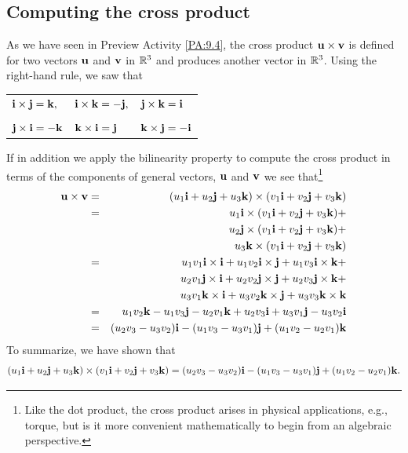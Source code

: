 

\subsection*{Computing the cross product}

As we have seen in Preview Activity \ref{PA:9.4}, the cross product
$\mathbf{u}\times\mathbf{v}$ is defined for two vectors $\mathbf{u}$ and $\mathbf{v}$ in $\mathbb{R}^3$
and produces another vector in $\mathbb{R}^3$.
Using the right-hand rule, we saw that

\begin{table}[ht]
  \label{T:9.4.cross.basis}
  \begin{center}
    \begin{tabular}{lll}
      $\mathbf{i}\times\mathbf{j} = \mathbf{k},$ \hspace*{1in} &
      $\mathbf{i}\times\mathbf{k} = -\mathbf{j},$ \hspace*{1in} &
      $\mathbf{j}\times\mathbf{k} = \mathbf{i}$\hspace*{1in} \\ \\
      $\mathbf{j}\times\mathbf{i} = -\mathbf{k}$ &
      $\mathbf{k}\times\mathbf{i} = \mathbf{j}$ &
      $\mathbf{k}\times\mathbf{j} = -\mathbf{i}$
    \end{tabular}
  \end{center}
\end{table}

If in addition we apply the bilinearity property to compute the cross product
in terms of the components of general vectors, $\mathbf{u}$ and $\mathbf{v}$ we see that\footnote{Like the dot product, the cross product arises in physical applications, e.g., torque, but is it more convenient mathematically to begin from an algebraic perspective.} 
\begin{eqnarray*}
  \mathbf{u}\times\mathbf{v} & = & (u_1\mathbf{i} + u_2\mathbf{j} + u_3\mathbf{k}) \times 
  (v_1\mathbf{i} + v_2\mathbf{j} + v_3\mathbf{k}) \\
  & = & u_1\mathbf{i}\times  (v_1\mathbf{i} + v_2\mathbf{j} + v_3\mathbf{k})+ \\
  & & u_2\mathbf{j}\times  (v_1\mathbf{i} + v_2\mathbf{j} + v_3\mathbf{k})+ \\
  & & u_3\mathbf{k}\times  (v_1\mathbf{i} + v_2\mathbf{j} + v_3\mathbf{k}) \\
  & = & u_1v_1\mathbf{i}\times\mathbf{i} + u_1v_2\mathbf{i}\times\mathbf{j} + u_1v_3\mathbf{i}\times\mathbf{k} +\\
  &  & u_2v_1\mathbf{j}\times\mathbf{i} + u_2v_2\mathbf{j}\times\mathbf{j} + u_2v_3\mathbf{j}\times\mathbf{k} + \\
  &  & u_3v_1\mathbf{k}\times\mathbf{i} + u_3v_2\mathbf{k}\times\mathbf{j} + u_3v_3\mathbf{k}\times\mathbf{k}
  \\
  & = & u_1v_2\mathbf{k} - u_1v_3\mathbf{j} - u_2v_1\mathbf{k} + u_2v_3\mathbf{i} +u_3v_1\mathbf{j} -
  u_3v_2\mathbf{i} \\
  & = & (u_2v_3-u_3v_2)\mathbf{i} - (u_1v_3-u_3v_1)\mathbf{j} + (u_1v_2-u_2v_1)\mathbf{k}
\end{eqnarray*}
To summarize, we have shown that
\begin{equation}\label{E:9.4.cross.def}
(u_1\mathbf{i} + u_2\mathbf{j} + u_3\mathbf{k}) \times 
  (v_1\mathbf{i} + v_2\mathbf{j} + v_3\mathbf{k}) = 
(u_2v_3-u_3v_2)\mathbf{i} - (u_1v_3-u_3v_1)\mathbf{j} + (u_1v_2-u_2v_1)\mathbf{k}.
\end{equation}

